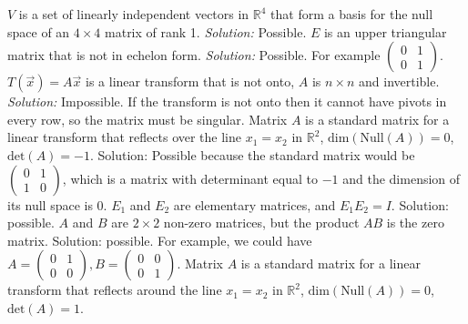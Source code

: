     $V$ is a set of linearly independent vectors in $\mathbb R^4$ that form a basis for the null space of an  $4\times 4$ 
     matrix of rank 1. 
    \ifnum {} {\color{DarkBlue} \textit{Solution:  } Possible.  } \fi
\fi      
\ifnum {}
    \setlength{\extrarowheight}{0.00cm} 
    $E$ is an upper triangular matrix that is not in echelon form. 
    \ifnum {} {\color{DarkBlue} \textit{Solution:  } Possible. For example $\begin{pmatrix} 0& 1 \\ 0 & 1\end{pmatrix}$. } \fi
\fi      
\ifnum {}
    $T(\vec x) = A\vec x$ is a linear transform that is not onto, $A$ is $n\times n$ and invertible.
    \ifnum {} {\color{DarkBlue} \textit{Solution:  } Impossible. If the transform is not onto then it cannot have pivots in every row, so the matrix must be singular. } \fi
\fi      
\ifnum {}
    \setlength{\extrarowheight}{0.00cm} 
     Matrix $A$ is a standard matrix for a linear transform that reflects over the line $x_1=x_2$ in $\mathbb R^2$, $\text{dim}(\text{Null}(A))=0$, $\text{det}(A)=-1$. 
    \ifnum {} {\color{DarkBlue} Solution: Possible because the standard matrix would be $\begin{pmatrix} 0&1\\1&0 \end{pmatrix}$, which is a matrix with determinant equal to $-1$ and the dimension of its null space is 0. 
    } \fi
\fi    
\ifnum {} %
    \setlength{\extrarowheight}{0.00cm} $E_1$ and $E_2$ are elementary matrices, and $E_1E_2 = I$. 
    \ifnum {} {\color{DarkBlue} Solution:  possible. 
    } \fi
\fi    
\ifnum {} %
    \setlength{\extrarowheight}{0.00cm} $A$ and $B$ are $2\times2$ non-zero matrices, but the product $AB$ is the zero matrix.
    \ifnum {} {\color{DarkBlue} Solution:  possible. For example, we could have $A = \begin{pmatrix} 0&1\\0&0\end{pmatrix}, B = \begin{pmatrix} 0&0\\0&1\end{pmatrix}$. 
    } \fi
\fi    
\ifnum {} %
    \setlength{\extrarowheight}{0.00cm} 
    Matrix $A$ is a standard matrix for a linear transform that reflects around the line $x_1=x_2$ in $\mathbb R^2$, $\text{dim}(\text{Null}(A))=0$, $\text{det}(A)=1$. 
